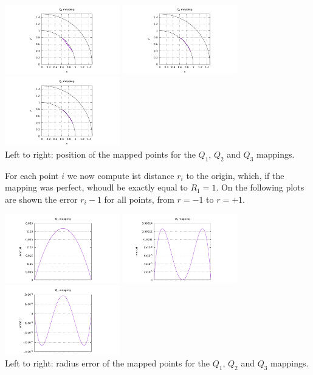 \begin{center}
\includegraphics[width=5cm]{images/mappings/curved/xy1.pdf}
\includegraphics[width=5cm]{images/mappings/curved/xy2.pdf}
\includegraphics[width=5cm]{images/mappings/curved/xy3.pdf}\\
{\captionfont Left to right: position of the mapped points for the $Q_1$, $Q_2$ and $Q_3$ mappings.}
\end{center}

For each point $i$ we now compute ist distance $r_i$ 
to the origin, which, if the 
mapping was perfect, whoudl be exactly equal to $R_1=1$. 
On the following plots are shown the error $r_i-1$ for all 
points, from $r=-1$ to $r=+1$.

\begin{center}
\includegraphics[width=5cm]{images/mappings/curved/innerline_error_Q1mapping.pdf}
\includegraphics[width=5cm]{images/mappings/curved/innerline_error_Q2mapping.pdf}
\includegraphics[width=5cm]{images/mappings/curved/innerline_error_Q3mapping.pdf}\\
{\captionfont Left to right: radius error of the mapped points for the $Q_1$, $Q_2$ and $Q_3$ mappings.}
\end{center}

